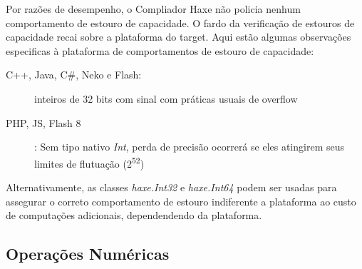 Por razões de desempenho, o Compliador Haxe não policia nenhum comportamento de estouro de capacidade. O fardo da verificação de estouros de capacidade recai sobre a plataforma do target. Aqui estão algumas observações especificas à plataforma de comportamentos de estouro de capacidade:

\begin{description}
	\item[C++, Java, C\#, Neko e Flash:] inteiros de 32 bits com sinal com práticas usuais de overflow
	\item[PHP, JS, Flash 8]: Sem tipo nativo \emph{Int}, perda de precisão ocorrerá se eles atingirem seus limites de flutuação (2\textsuperscript{52})
\end{description}

Alternativamente, as classes \emph{haxe.Int32} e \emph{haxe.Int64} podem ser usadas para assegurar o correto comportamento de estouro indiferente a plataforma ao custo de computações adicionais, dependendendo da plataforma.

\subsection{Operações Numéricas}
\label{types-numeric-operators}

